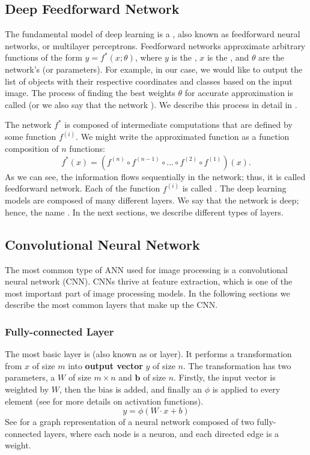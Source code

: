 \subsection{Deep Feedforward Network}
The fundamental model of deep learning is a , also
known as feedforward neural networks, or multilayer perceptrons. Feedforward
networks approximate arbitrary functions of the form $y = f^*(x;\theta)$, where
$y$ is the , $x$ is the , and $\theta$ are the network's
 (or parameters). For example, in our case, we would like to
output the list of objects with their respective coordinates and classes based
on the input image. The process of finding the best weights $\theta$ for
accurate approximation is called  (or we also say that the network
). We describe this process in detail in
.

The network $f^*$ is composed of intermediate computations that are defined by
some function $f^{(i)}$. We might write the approximated function as a function
composition of $n$ functions:
$$
    f^*(x) = (f^{(n)} \circ f^{(n-1)} \circ ... \circ f^{(2)} \circ f^{(1)})(x).
$$
As we can see, the information flows sequentially in the network; thus, it is
called feedforward network. Each of the function $f^{(i)}$ is called .
The deep learning models are composed of many different layers. We say that the
network is deep; hence, the name . In the next sections, we
describe different types of layers.

\subsection{Convolutional Neural Network}
The most common type of ANN used for image processing is a convolutional neural
network (CNN). CNNs thrive at feature extraction, which is one of the most
important part of image processing models. In the following sections we describe
the most common layers that make up the CNN.

\subsubsection{Fully-connected Layer}
The most basic layer is  (also known as
 or  layer). It performs a transformation from
 $x$ of size $m$ into \textbf{output vector}
$y$ of size $n$. The transformation has two parameters, a
 $W$ of size $m \times n$ and 
$\boldsymbol{b}$ of size $n$. Firstly, the input vector is weighted by $W$, then
the bias is added, and finally an  $\phi$
is applied to every element (see  for more details on
activation functions).
$$
    y = \phi(W\cdot x + b)
$$
See  for a graph representation of a neural network composed
of two fully-connected layers, where each node is a neuron, and each directed
edge is a weight.

